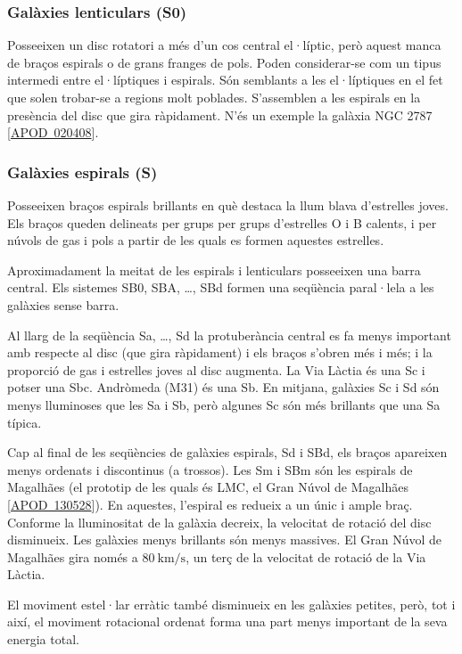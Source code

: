 \subsubsection*{Galàxies lenticulars (S0)}
Posseeixen un disc rotatori a més d'un cos central el·líptic, però aquest manca de braços espirals o de grans franges de pols. Poden considerar-se com un tipus intermedi entre el·líptiques i espirals. Són semblants a les el·líptiques en el fet que solen trobar-se a regions molt poblades. S'assemblen a les espirals en la presència del disc que gira ràpidament. N'és un exemple la galàxia NGC 2787 [\href{http://apod.nasa.gov/apod/ap020408.html}{APOD~020408}].

\subsubsection*{Galàxies espirals (S)}
Posseeixen braços espirals brillants en què destaca la llum blava d'estrelles joves. Els braços queden delineats per grups per grups d'estrelles O i B calents, i per núvols de gas i pols a partir de les quals es formen aquestes estrelles.

Aproximadament la meitat de les espirals i lenticulars posseeixen una barra central. Els sistemes SB0, SBA, \dots, SBd formen una seqüència paral·lela a les galàxies sense barra.

Al llarg de la seqüència Sa, \dots, Sd la protuberància central es fa menys important amb respecte al disc (que gira ràpidament) i els braços s'obren més i més; i la proporció de gas i estrelles joves al disc augmenta. La Via Làctia és una Sc i potser una Sbc. Andròmeda (M31) és una Sb. En mitjana, galàxies Sc i Sd són menys lluminoses que les Sa i Sb, però algunes Sc són més brillants que una Sa típica.

Cap al final de les seqüències de galàxies espirals, Sd i SBd, els braços apareixen menys ordenats i discontinus (a trossos). Les Sm i SBm són les espirals de Magalhães (el prototip de les quals és LMC, el Gran Núvol de Magalhães [\href{http://apod.nasa.gov/apod/ap130528.html}{APOD~130528}]). En aquestes, l'espiral es redueix a un únic i ample braç. Conforme la lluminositat de la galàxia decreix, la velocitat de rotació del disc disminueix. Les galàxies menys brillants són menys massives. El Gran Núvol de Magalhães gira només a $\SI{80}{\km \per\s}$, un terç de la velocitat de rotació de la Via Làctia.

El moviment estel·lar erràtic també disminueix en les galàxies petites, però, tot i així, el moviment rotacional ordenat forma una part menys important de la seva energia total.

